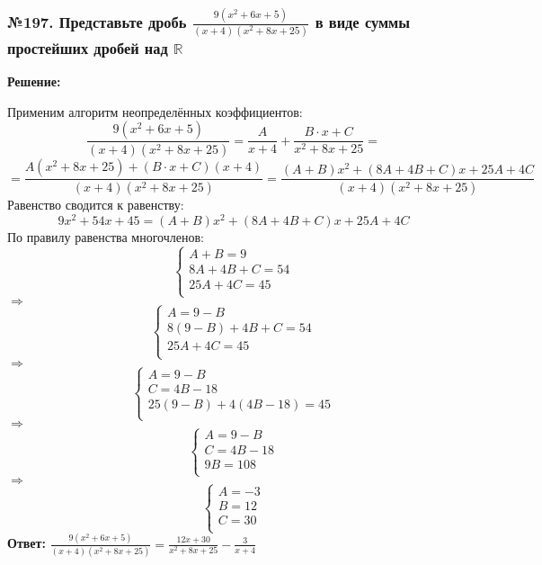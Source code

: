 \documentclass[a4paper]{article}
\begin{document}
\subsubsection*{№197. Представьте дробь $\frac{9(x^2+6x+5)}{(x+4)(x^2+8x+25)}$ в виде суммы простейших дробей над $\mathbb{R}$}
\textbf{Решение:} \par 
Применим алгоритм неопределённых коэффициентов:
\[\frac{9(x^2+6x+5)}{(x+4)(x^2+8x+25)}=\frac{A}{x+4}+\frac{B\cdot x+C}{x^2+8x+25}=\]\[=\frac{A(x^2+8x+25)+(B\cdot x+C)(x+4)}{(x+4)(x^2+8x+25)}=\frac{(A+B)x^2+(8A+4B+C)x+25A+4C}{(x+4)(x^2+8x+25)}\]
Равенство сводится к равенству:
\[9x^2+54x+45=(A+B)x^2+(8A+4B+C)x+25A+4C\]
По правилу равенства многочленов:
\begin{equation*}
 \begin{cases}
	A+B=9 \\
	8A+4B+C=54 \\
	25A+4C=45 \\
 \end{cases}
\end{equation*}
$\Rightarrow$
\begin{equation*}
 \begin{cases}
	A=9-B \\
	8(9-B)+4B+C=54 \\
	25A+4C=45 \\
 \end{cases}
\end{equation*}
$\Rightarrow$
\begin{equation*}
 \begin{cases}
	A=9-B \\
	C=4B-18 \\
	25(9-B)+4(4B-18)=45 \\
 \end{cases}
\end{equation*}
$\Rightarrow$
\begin{equation*}
 \begin{cases}
	A=9-B \\
	C=4B-18 \\
	9B=108 \\
 \end{cases}
\end{equation*}
$\Rightarrow$
\begin{equation*}
 \begin{cases}
	A=-3 \\
	B=12 \\
	C=30 \\
 \end{cases}
\end{equation*}
\textbf{Ответ:} $\frac{9(x^2+6x+5)}{(x+4)(x^2+8x+25)}=\frac{12x+30}{x^2+8x+25}-\frac{3}{x+4}$
\end{document}
